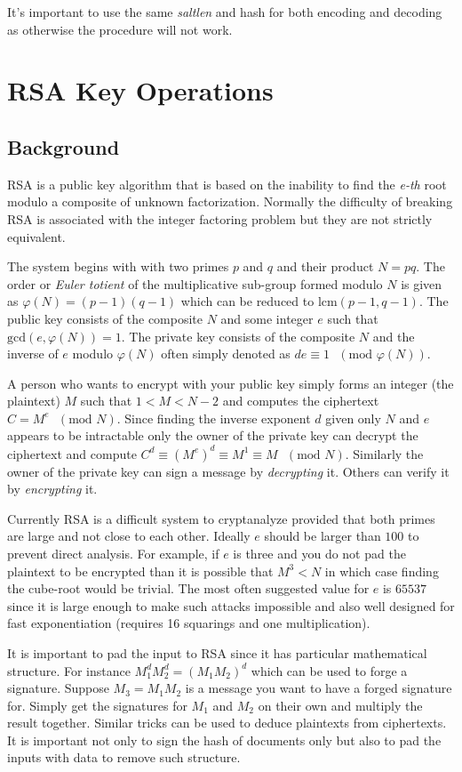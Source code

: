\documentclass[synpaper]{book}
\def\phi{\varphi}
\newcommand{\mysection}[1]    %
	{                   %
	\section{#1}
   \markboth{\textsf{www.libtom.org}}{\thesection ~ {#1}}
	}
\begin{document}
It's important to use the same \textit{saltlen} and hash for both encoding and decoding as otherwise the procedure will not work.

\mysection{RSA Key Operations}
\subsection{Background}

RSA is a public key algorithm that is based on the inability to find the \textit{e-th} root modulo a composite of unknown 
factorization.  Normally the difficulty of breaking RSA is associated with the integer factoring problem but they are
not strictly equivalent.

The system begins with with two primes $p$ and $q$ and their product $N = pq$.  The order or \textit{Euler totient} of the
multiplicative sub-group formed modulo $N$ is given as $\phi(N) = (p - 1)(q - 1)$ which can be reduced to 
$\mbox{lcm}(p - 1, q - 1)$.  The public key consists of the composite $N$ and some integer $e$ such that 
$\mbox{gcd}(e, \phi(N)) = 1$.  The private key consists of the composite $N$ and the inverse of $e$ modulo $\phi(N)$ 
often simply denoted as $de \equiv 1\mbox{ }(\mbox{mod }\phi(N))$.

A person who wants to encrypt with your public key simply forms an integer (the plaintext) $M$ such that 
$1 < M < N-2$ and computes the ciphertext $C = M^e\mbox{ }(\mbox{mod }N)$.  Since finding the inverse exponent $d$
given only $N$ and $e$ appears to be intractable only the owner of the private key can decrypt the ciphertext and compute
$C^d \equiv \left (M^e \right)^d \equiv M^1 \equiv M\mbox{ }(\mbox{mod }N)$.  Similarly the owner of the private key 
can sign a message by \textit{decrypting} it.  Others can verify it by \textit{encrypting} it.  

Currently RSA is a difficult system to cryptanalyze provided that both primes are large and not close to each other.  
Ideally $e$ should be larger than $100$ to prevent direct analysis.  For example, if $e$ is three and you do not pad
the plaintext to be encrypted than it is possible that $M^3 < N$ in which case finding the cube-root would be trivial.  
The most often suggested value for $e$ is $65537$ since it is large enough to make such attacks impossible and also well 
designed for fast exponentiation (requires 16 squarings and one multiplication).

It is important to pad the input to RSA since it has particular mathematical structure.  For instance  
$M_1^dM_2^d = (M_1M_2)^d$ which can be used to forge a signature.  Suppose $M_3 = M_1M_2$ is a message you want
to have a forged signature for.  Simply get the signatures for $M_1$ and $M_2$ on their own and multiply the result
together.  Similar tricks can be used to deduce plaintexts from ciphertexts.  It is important not only to sign 
the hash of documents only but also to pad the inputs with data to remove such structure.  
\end{document}
